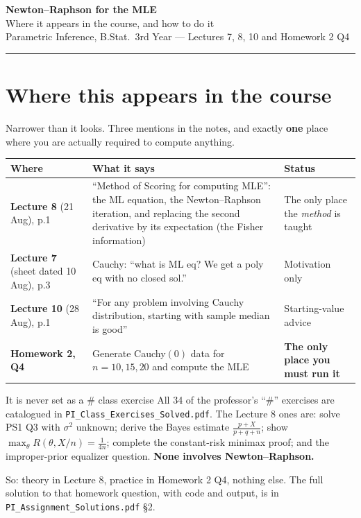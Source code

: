 \documentclass[11pt]{article}
\begin{document}
\begin{center}
{\LARGE\bfseries Newton--Raphson for the MLE}\\[3pt]
{\large Where it appears in the course, and how to do it}\\[5pt]
{\small Parametric Inference, B.Stat.\ 3rd Year --- Lectures 7, 8, 10 and Homework 2 Q4}
\end{center}

\vspace{4pt}\hrule\vspace{10pt}

\tableofcontents

\section{Where this appears in the course}

Narrower than it looks. Three mentions in the notes, and exactly \textbf{one} place where you
are actually required to compute anything.

\begin{center}
\renewcommand{\arraystretch}{1.4}
\begin{tabular}{@{}p{3.4cm}p{7.8cm}p{4.0cm}@{}}
\toprule
\textbf{Where} & \textbf{What it says} & \textbf{Status} \\
\midrule
\textbf{Lecture 8} (21 Aug), p.1 &
``Method of Scoring for computing MLE'': the ML equation, the Newton--Raphson iteration, and
replacing the second derivative by its expectation (the Fisher information) &
The only place the \emph{method} is taught \\
\textbf{Lecture 7} (sheet dated 10 Aug), p.3 &
Cauchy: ``what is ML eq? We get a poly eq with no closed sol.'' &
Motivation only \\
\textbf{Lecture 10} (28 Aug), p.1 &
``For any problem involving Cauchy distribution, starting with sample median is good'' &
Starting-value advice \\
\textbf{Homework 2, Q4} &
Generate Cauchy$(0)$ data for $n=10,15,20$ and compute the MLE &
\textbf{The only place you must run it} \\
\bottomrule
\end{tabular}
\end{center}

\begin{idea}{It is never set as a \# class exercise}
All 34 of the professor's ``\#'' exercises are catalogued in
\texttt{PI\_Class\_Exercises\_Solved.pdf}. The Lecture 8 ones are: solve PS1 Q3 with
$\sigma^2$ unknown; derive the Bayes estimate $\frac{p+X}{p+q+n}$; show
$\max_\theta R(\theta,X/n)=\frac{1}{4n}$; complete the constant-risk minimax proof; and the
improper-prior equalizer question. \textbf{None involves Newton--Raphson.}

So: theory in Lecture 8, practice in Homework 2 Q4, nothing else. The full solution to that
homework question, with code and output, is in \texttt{PI\_Assignment\_Solutions.pdf} \S2.
\end{idea}
\end{document}
